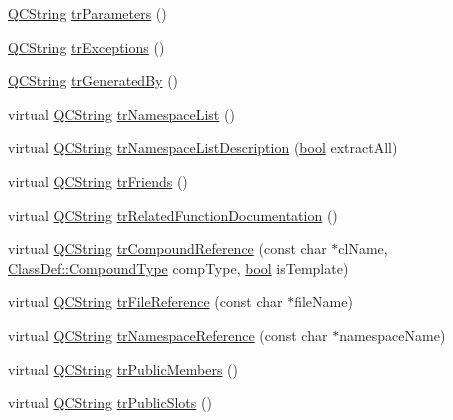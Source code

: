 \begin{DoxyCompactItemize}
\item 
\hyperlink{class_q_c_string}{Q\+C\+String} \hyperlink{class_translator_portuguese_a0f900080af87aa9264e9b220c8ef623e}{tr\+Parameters} ()
\item 
\hyperlink{class_q_c_string}{Q\+C\+String} \hyperlink{class_translator_portuguese_a01f09c27b890470bffcde6e8274e3b71}{tr\+Exceptions} ()
\item 
\hyperlink{class_q_c_string}{Q\+C\+String} \hyperlink{class_translator_portuguese_a161fe78f84318411181b2cbe7d8f4f67}{tr\+Generated\+By} ()
\item 
virtual \hyperlink{class_q_c_string}{Q\+C\+String} \hyperlink{class_translator_portuguese_a115ac84d17a0ef69c3312e70fbc37086}{tr\+Namespace\+List} ()
\item 
virtual \hyperlink{class_q_c_string}{Q\+C\+String} \hyperlink{class_translator_portuguese_a644d9d810439ea4a7a16f7cf5eee664c}{tr\+Namespace\+List\+Description} (\hyperlink{qglobal_8h_a1062901a7428fdd9c7f180f5e01ea056}{bool} extract\+All)
\item 
virtual \hyperlink{class_q_c_string}{Q\+C\+String} \hyperlink{class_translator_portuguese_a81f30a769a23775437acbf7a5cca33c6}{tr\+Friends} ()
\item 
virtual \hyperlink{class_q_c_string}{Q\+C\+String} \hyperlink{class_translator_portuguese_a4e5b7585447dbdfb983640c410ff50e8}{tr\+Related\+Function\+Documentation} ()
\item 
virtual \hyperlink{class_q_c_string}{Q\+C\+String} \hyperlink{class_translator_portuguese_ae15304024883a04e35c5bc568d706b51}{tr\+Compound\+Reference} (const char $\ast$cl\+Name, \hyperlink{class_class_def_ae70cf86d35fe954a94c566fbcfc87939}{Class\+Def\+::\+Compound\+Type} comp\+Type, \hyperlink{qglobal_8h_a1062901a7428fdd9c7f180f5e01ea056}{bool} is\+Template)
\item 
virtual \hyperlink{class_q_c_string}{Q\+C\+String} \hyperlink{class_translator_portuguese_a80cd24e5a18febdbfb0d7e1e6552665f}{tr\+File\+Reference} (const char $\ast$file\+Name)
\item 
virtual \hyperlink{class_q_c_string}{Q\+C\+String} \hyperlink{class_translator_portuguese_ab46e3a8d64cb394d06492746feae4114}{tr\+Namespace\+Reference} (const char $\ast$namespace\+Name)
\item 
virtual \hyperlink{class_q_c_string}{Q\+C\+String} \hyperlink{class_translator_portuguese_af3328603161c161c8d9d7beee0ad956d}{tr\+Public\+Members} ()
\item 
virtual \hyperlink{class_q_c_string}{Q\+C\+String} \hyperlink{class_translator_portuguese_ab129ecfe1a3ab25de7cd5d24dc5d4321}{tr\+Public\+Slots} ()

\end{DoxyCompactItemize}
